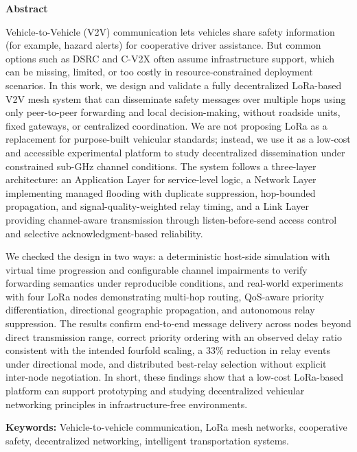 \begin{center}
    \Large \textbf{Abstract}
\end{center}

\vspace{0.8cm}


Vehicle-to-Vehicle (V2V) communication lets vehicles share safety information (for example, hazard alerts)
for cooperative driver assistance. But common options such as DSRC and C-V2X often
assume infrastructure support, which can be missing, limited, or too costly in
resource-constrained deployment scenarios. In this work, we design and validate a fully
decentralized LoRa-based V2V mesh system that can disseminate safety messages over
multiple hops using only peer-to-peer forwarding and local decision-making, without
roadside units, fixed gateways, or centralized coordination. We are not proposing LoRa as a
replacement for purpose-built vehicular standards; instead, we use it as a low-cost and
accessible experimental platform to study decentralized dissemination under constrained
sub-GHz channel conditions. The system follows a three-layer architecture: an Application
Layer for service-level logic, a Network Layer implementing managed flooding with
duplicate suppression, hop-bounded propagation, and signal-quality-weighted relay timing,
and a Link Layer providing channel-aware transmission through listen-before-send access
control and selective acknowledgment-based reliability.

We checked the design in two ways: a deterministic host-side
simulation with virtual time progression and configurable channel impairments to verify
forwarding semantics under reproducible conditions, and real-world experiments with four
LoRa nodes demonstrating multi-hop routing, QoS-aware priority differentiation,
directional geographic propagation, and autonomous relay suppression. The results confirm
end-to-end message delivery across nodes beyond direct transmission range, correct priority
ordering with an observed delay ratio consistent with the intended fourfold scaling, a 33\%
reduction in relay events under directional mode, and distributed best-relay selection
without explicit inter-node negotiation. In short, these findings show that a low-cost
LoRa-based platform can support prototyping and studying decentralized vehicular
networking principles in infrastructure-free environments.

\vspace{0.8cm}

\noindent\textbf{Keywords:} Vehicle-to-vehicle communication, LoRa mesh networks, cooperative safety, decentralized networking, intelligent transportation systems.